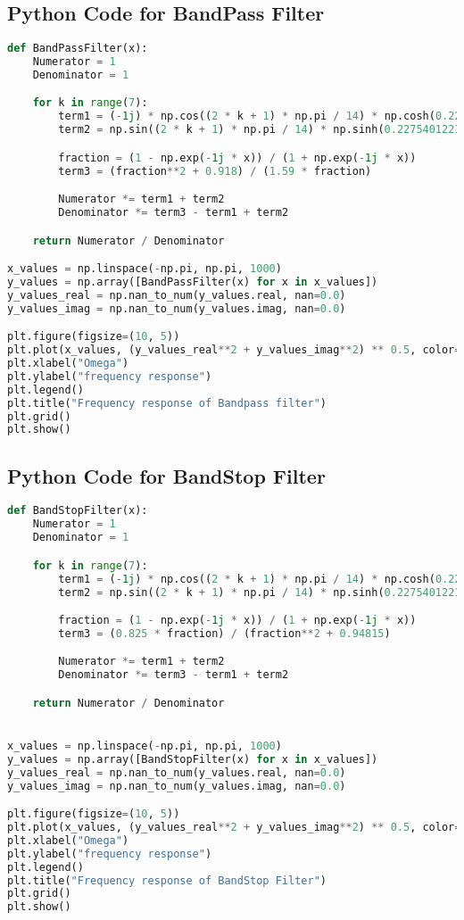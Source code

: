 \documentclass{article}
\begin{document}
\subsection{Python Code for BandPass Filter}
\begin{lstlisting}[language=Python, caption=Filter Type Definition]
def BandPassFilter(x):
    Numerator = 1
    Denominator = 1

    for k in range(7):
        term1 = (-1j) * np.cos((2 * k + 1) * np.pi / 14) * np.cosh(0.227540122101)
        term2 = np.sin((2 * k + 1) * np.pi / 14) * np.sinh(0.227540122101)

        fraction = (1 - np.exp(-1j * x)) / (1 + np.exp(-1j * x))
        term3 = (fraction**2 + 0.918) / (1.59 * fraction)

        Numerator *= term1 + term2
        Denominator *= term3 - term1 + term2

    return Numerator / Denominator

x_values = np.linspace(-np.pi, np.pi, 1000)
y_values = np.array([BandPassFilter(x) for x in x_values])
y_values_real = np.nan_to_num(y_values.real, nan=0.0)
y_values_imag = np.nan_to_num(y_values.imag, nan=0.0)

plt.figure(figsize=(10, 5))
plt.plot(x_values, (y_values_real**2 + y_values_imag**2) ** 0.5, color="r",)
plt.xlabel("Omega")
plt.ylabel("frequency response")
plt.legend()
plt.title("Frequency response of Bandpass filter")
plt.grid()
plt.show()
\end{lstlisting}

\subsection{Python Code for BandStop Filter}
\begin{lstlisting}[language=Python, caption=Filter Type Definition]
def BandStopFilter(x):
    Numerator = 1
    Denominator = 1

    for k in range(7):
        term1 = (-1j) * np.cos((2 * k + 1) * np.pi / 14) * np.cosh(0.227540122101)
        term2 = np.sin((2 * k + 1) * np.pi / 14) * np.sinh(0.227540122101)

        fraction = (1 - np.exp(-1j * x)) / (1 + np.exp(-1j * x))
        term3 = (0.825 * fraction) / (fraction**2 + 0.94815)

        Numerator *= term1 + term2
        Denominator *= term3 - term1 + term2

    return Numerator / Denominator


x_values = np.linspace(-np.pi, np.pi, 1000)
y_values = np.array([BandStopFilter(x) for x in x_values])
y_values_real = np.nan_to_num(y_values.real, nan=0.0)
y_values_imag = np.nan_to_num(y_values.imag, nan=0.0)

plt.figure(figsize=(10, 5))
plt.plot(x_values, (y_values_real**2 + y_values_imag**2) ** 0.5, color="b")
plt.xlabel("Omega")
plt.ylabel("frequency response")
plt.legend()
plt.title("Frequency response of BandStop Filter")
plt.grid()
plt.show()
\end{lstlisting}
\end{document}
